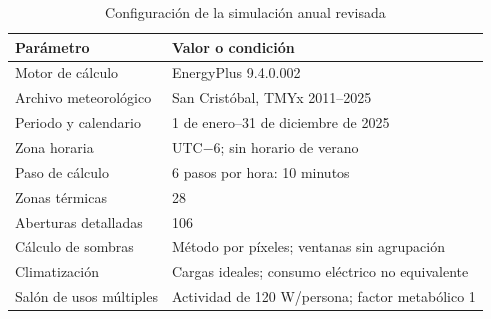 \begin{table}[H]
\centering
\caption{Configuración de la simulación anual revisada}
\label{tab:db-configuracion}
{\small\renewcommand{\arraystretch}{1.12}
\begin{tabular}{p{4.2cm}p{8.8cm}}
\toprule
Parámetro & Valor o condición \\
\midrule
Motor de cálculo & EnergyPlus 9.4.0.002 \\
Archivo meteorológico & San Cristóbal, TMYx 2011--2025 \\
Periodo y calendario & 1 de enero--31 de diciembre de 2025 \\
Zona horaria & UTC$-6$; sin horario de verano \\
Paso de cálculo & 6 pasos por hora: 10 minutos \\
Zonas térmicas & 28 \\
Aberturas detalladas & 106 \\
Cálculo de sombras & Método por píxeles; ventanas sin agrupación \\
Climatización & Cargas ideales; consumo eléctrico no equivalente \\
Salón de usos múltiples & Actividad de 120 W/persona; factor metabólico 1 \\
\bottomrule
\end{tabular}}
\end{table}

